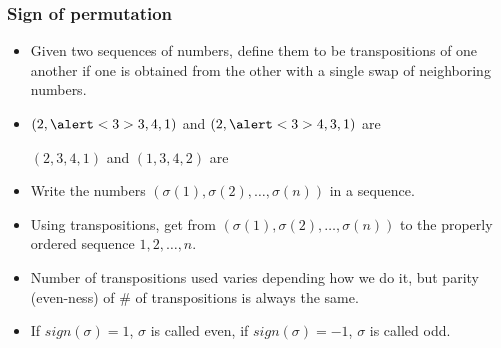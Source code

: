 \begin{frame}
\frametitle{Sign of permutation}
\begin{itemize}
\item Given two sequences of numbers, define them to be transpositions of one another if one is obtained from the other with a \alert<1>{single swap of \alert<5>{neighboring} numbers}.
\item<2-> \alert<2>{$(2,\alert<3>{3,4},1) $ and $(2,\alert<3>{4,3},1) $ are} 

\alert<4>{$(2,3,4,1) $ and $(1,3,4,2) $ are} 
\item<6-> Write the numbers $\left(\sigma(1),\sigma(2), \dots, \sigma(n)\right)$ in a sequence. 
\item<7-> Using transpositions, get from $\left(\sigma(1),\sigma(2), \dots, \sigma(n)\right)$ to the properly ordered sequence $1,2,\dots, n$.
\item<8-> Number of transpositions used varies depending how we do it, but parity (even-ness) of \# of transpositions is always the same.
\item<10-> If $sign(\sigma)=1$,  $\sigma$ is called even, if $sign(\sigma)=-1$, $\sigma$ is called odd.
\end{itemize}
\end{frame}